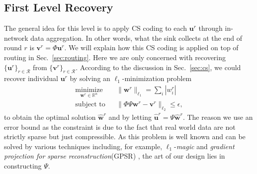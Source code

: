 \documentclass[conference]{IEEEtran}
\begin{document}
  \subsection{First Level Recovery} \label{sec:1level}
The general idea for this level is to apply CS coding to each $\mathbf{u}^r$ through in-network data aggregation. In other words, what the sink collects at the end of round $r$ is $\mathbf{v}^r = \Phi \mathbf{u}^r$. We will explain how this CS coding is applied on top of routing in Sec.~\ref{sec:routing}. Here we are only concerned with recovering $\{\mathbf{u}^r\}_{r \in \mathcal{R}}$ from $\{\mathbf{v}^r\}_{r \in \mathcal{R}}$. According to the discussion in Sec.~\ref{sec:cs}, we could recover individual $\mathbf{u}^r$ by solving an $\ell_1$-minimization problem
    \begin{eqnarray}
\underset{\mathbf{w}^r \in \mathbb{R}^n}{\mathrm{minimize}} && \|\mathbf{w}^r\|_{\ell_1} = \sum_i |w^r_i| \label{eq:cs+}\\
\mbox{subject to} && \|\Phi \Psi \mathbf{w}^r - \mathbf{v}^r \|_{\ell_2} \le \epsilon, \nonumber
\end{eqnarray}
to obtain the optimal solution $\mathbf{\hat{w}}^r$ and by letting $\mathbf{\hat{u}}^r = \Psi \mathbf{\hat{w}}^r$. The reason we use an error bound as the constraint is due to the fact that real world data are not strictly sparse but just compressible. As this problem is well known and can be solved by various techniques including, for example, $\ell_1$-\textit{magic} \cite{L1magic} and \textit{gradient projection for sparse  reconstruction}(GPSR) \cite{GPSR}, the art of our design lies in constructing $\Psi$.
\end{document}
